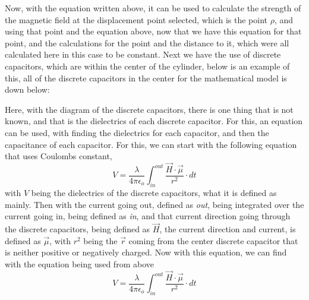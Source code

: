 \documentclass[]{article}
\begin{document}
Now, with the equation written above, it can be used to calculate the strength of the magnetic field at the displacement point selected, which is the point $\rho$, and using that point and the equation above, now that we have this equation for that point, and the calculations for the point and the distance to it, which were all calculated here in this case to be constant. Next we have the use of discrete capacitors, which are within the center of the cylinder, below is an example of this, all of the discrete capacitors in the center for the mathematical model is down below: 
\begin{figure}
\end{figure}
Here, with the diagram of the discrete capacitors, there is one thing that is not known, and that is the dielectrics of each discrete capacitor. For this, an equation can be used, with finding the dielectrics for each capacitor, and then the capacitance of each capacitor. For this, we can start with the following equation that uses Coulombs constant,
\begin{equation}
V = \frac{\lambda}{4\pi\epsilon_o} \int_{in}^{out} \frac{\vec{H}\cdot \vec{\mu}}{r^2} \cdot dt
\end{equation}
with $V$ being the dielectrics of the discrete capacitors, what it is defined as mainly. Then with the current going out, defined as \textit{out}, being integrated over the current going in, being defined as \textit{in}, and that current direction going through the discrete capacitors, being defined as $\vec{H}$, the current direction and current, is defined as $\vec{\mu}$, with $r^2$ being the $\vec{r}$ coming from the center discrete capacitor that is neither positive or negatively charged. Now with this equation, we can find with the equation being used from above 
\begin{equation}
V =\frac{\lambda}{4\pi\epsilon_o}\int_{in}^{out} \frac{\vec{H}\cdot \vec{\mu}}{r^2} \cdot dt
\end{equation}
\end{document}
